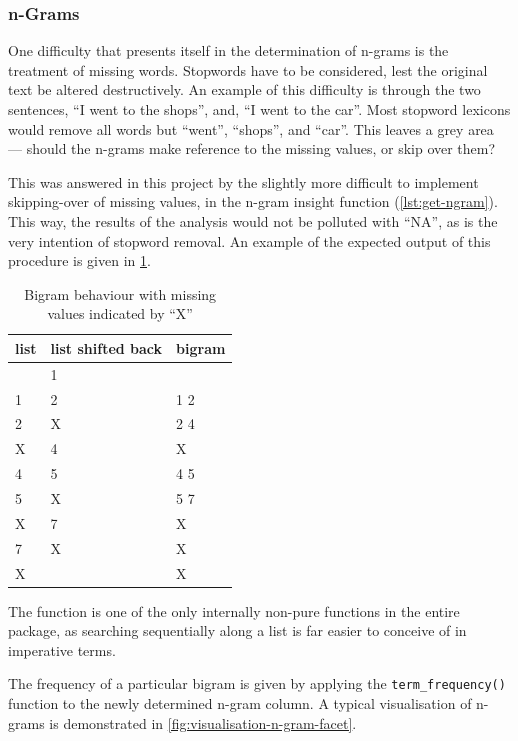 \message{ !name(jason-cairns-dissertation.tex)}\documentclass[11pt, a4paper, titlepage]{report}
\begin{document}
\subsubsection{n-Grams}\label{sec:n-grams}

One difficulty that presents itself in the determination of n-grams is
the treatment of missing words. Stopwords have to be considered, lest
the original text be altered destructively. An example of this
difficulty is through the two sentences, ``I went to the shops'', and,
``I went to the car''. Most stopword lexicons would remove all words
but ``went'', ``shops'', and ``car''. This leaves a grey area ---
should the n-grams make reference to the missing values, or skip over
them?

This was answered in this project by the slightly more difficult to
implement skipping-over of missing values, in the n-gram insight
function (\cref{lst:get-ngram}). This way, the results of the
analysis would not be polluted with ``NA'', as is the very intention
of stopword removal. An example of the expected output of this
procedure is given in \cref{tab:bigram-miss-val}.

\begin{table}
  \centering
\begin{tabular}{lll}
  list & list shifted back & bigram \\
  \midrule
       & 1                 &        \\
  1    & 2                 & 1 2    \\
  2    & X                 & 2 4    \\
  X    & 4                 & X      \\
  4    & 5                 & 4 5    \\
  5    & X                 & 5 7    \\
  X    & 7                 & X      \\
  7    & X                 & X      \\
  X    &                   & X      \\
\end{tabular}
\caption{Bigram behaviour with missing values indicated by ``X''\label{tab:bigram-miss-val}}
\end{table}

The function is one of the only internally non-pure functions in the
entire package, as searching sequentially along a list is far easier
to conceive of in imperative terms.

The frequency of a particular bigram is given by applying the
\texttt{term_frequency()} function to the newly determined
n-gram column. A typical visualisation of n-grams is demonstrated in
\cref{fig:visualisation-n-gram-facet}.
\end{document}
